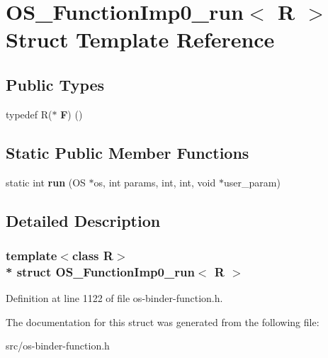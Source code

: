 \hypertarget{struct_o_s___function_imp0__run}{}\section{O\+S\+\_\+\+Function\+Imp0\+\_\+run$<$ R $>$ Struct Template Reference}
\label{struct_o_s___function_imp0__run}
\subsection*{Public Types}
\begin{DoxyCompactItemize}
\item 
typedef R($\ast$ {\bfseries F}) ()\hypertarget{struct_o_s___function_imp0__run_a68ea54e4d3381a082843a4743c0c625b}{}\label{struct_o_s___function_imp0__run_a68ea54e4d3381a082843a4743c0c625b}

\end{DoxyCompactItemize}
\subsection*{Static Public Member Functions}
\begin{DoxyCompactItemize}
\item 
static int {\bfseries run} (OS $\ast$os, int params, int, int, void $\ast$user\+\_\+param)\hypertarget{struct_o_s___function_imp0__run_aad34e0730de02f145b987d9f4f6f351b}{}\label{struct_o_s___function_imp0__run_aad34e0730de02f145b987d9f4f6f351b}

\end{DoxyCompactItemize}


\subsection{Detailed Description}
\subsubsection*{template$<$class R$>$\\*
struct O\+S\+\_\+\+Function\+Imp0\+\_\+run$<$ R $>$}



Definition at line 1122 of file os-\/binder-\/function.\+h.



The documentation for this struct was generated from the following file\+:\begin{DoxyCompactItemize}
\item 
src/os-\/binder-\/function.\+h\end{DoxyCompactItemize}
